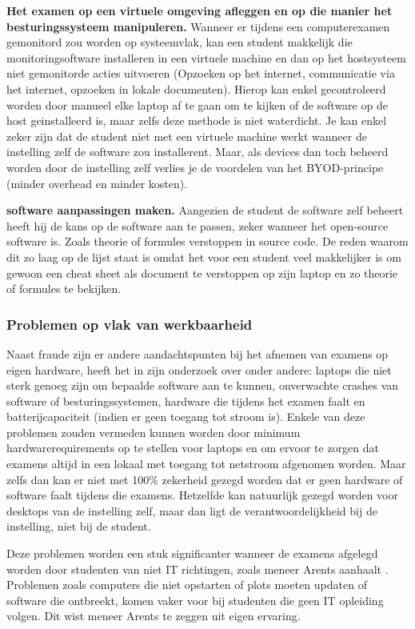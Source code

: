 \textbf{Het examen op een virtuele omgeving afleggen en op die manier het besturingssysteem manipuleren.} Wanneer er tijdens een computerexamen gemonitord zou worden op systeemvlak, kan een student makkelijk die monitoringsoftware installeren in een virtuele machine en dan op het hostsysteem niet gemonitorde acties uitvoeren (Opzoeken op het internet, communicatie via het internet, opzoeken in lokale documenten). Hierop kan enkel gecontroleerd worden door manueel elke laptop af te gaan om te kijken of de software op de host geinstalleerd is, maar zelfs deze methode is niet waterdicht. Je kan enkel zeker zijn dat de student niet met een virtuele machine werkt wanneer de instelling zelf de software zou installerent. Maar, als devices dan toch beheerd worden door de instelling zelf verlies je de voordelen van het BYOD-principe (minder overhead en minder kosten).

\textbf{software aanpassingen maken.} Aangezien de student de software zelf beheert heeft hij de kans op de software aan te passen, zeker wanneer het open-source software is. Zoals theorie of formules verstoppen in source code. De reden waarom dit zo laag op de lijst staat is omdat het voor een student veel makkelijker is om gewoon een cheat sheet als document te verstoppen op zijn laptop en zo theorie of formules te bekijken. 

\subsubsection{Problemen op vlak van werkbaarheid}
Naast fraude zijn er andere aandachtspunten bij het afnemen van examens op eigen hardware, \textcite{Hillier2015} heeft het in zijn onderzoek over onder andere: laptops die niet sterk genoeg zijn om bepaalde software aan te kunnen, onverwachte crashes van software of besturingssystemen, hardware die tijdens het examen faalt en batterijcapaciteit (indien er geen toegang tot stroom is). Enkele van deze problemen zouden vermeden kunnen worden door minimum hardwarerequirements op te stellen voor laptops en om ervoor te zorgen dat examens altijd in een lokaal met toegang tot netstroom afgenomen worden. Maar zelfs dan kan er niet met 100\% zekerheid gezegd worden dat er geen hardware of software faalt tijdens die examens. Hetzelfde kan natuurlijk gezegd worden voor desktops van de instelling zelf, maar dan ligt de verantwoordelijkheid bij de instelling, niet bij de student. 

Deze problemen worden een stuk significanter wanneer de examens afgelegd worden door studenten van niet IT richtingen, zoals meneer Arents aanhaalt \autocite{Arents2019}. Problemen zoals computers die niet opstarten of plots moeten updaten of software die ontbreekt, komen vaker voor bij studenten die geen IT opleiding volgen. Dit wist meneer Arents te zeggen uit eigen ervaring. 


